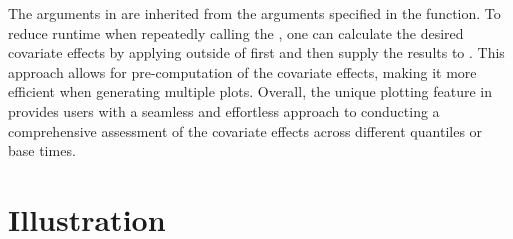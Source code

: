 The arguments in  are inherited from the arguments specified in
the  function.
To reduce runtime when repeatedly calling the ,
one can calculate the desired covariate effects by applying 
outside of  first and then supply the results to .
This approach allows for pre-computation of the covariate effects, making it more
efficient when generating multiple plots.
Overall, the unique plotting feature in  
provides users with a seamless and effortless approach to conducting a 
comprehensive assessment of the covariate effects across different quantiles or base times.

\section{Illustration} \label{sec:illustration}

